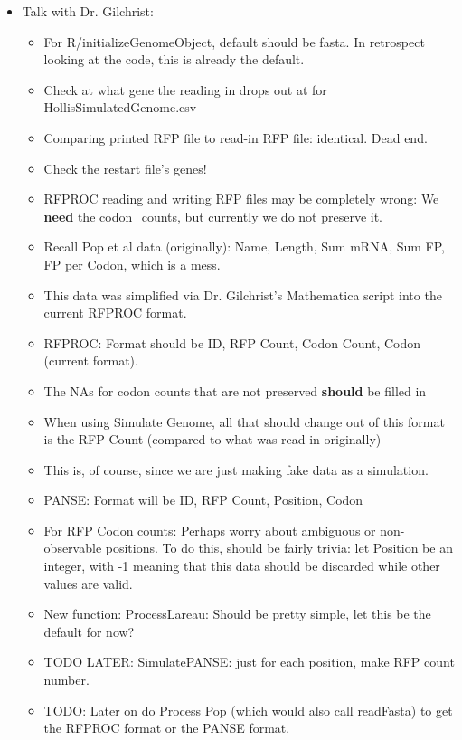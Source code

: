 \documentclass[12pt,hyperref]{labbook}
\begin{document}
\begin{itemize}
    \item Talk with Dr. Gilchrist:
    \begin{itemize}
        \item For R/initializeGenomeObject, default should be fasta.
        In retrospect looking at the code, this is already the default.
        \item Check at what gene the reading in drops out at for HollisSimulatedGenome.csv
        \item Comparing printed RFP file to read-in RFP file: identical. Dead end.
        \item Check the restart file's genes!
        \item RFPROC reading and writing RFP files may be completely wrong: We \textbf{need} the codon\_counts, but currently we do not preserve it.
        \item Recall Pop et al data (originally): Name, Length, Sum mRNA, Sum FP, FP per Codon, which is a mess.
        \item This data was simplified via Dr. Gilchrist's Mathematica script into the current RFPROC format.
        \item RFPROC: Format should be ID, RFP Count, Codon Count, Codon (current format).
        \item The NAs for codon counts that are not preserved \textbf{should} be filled in 
        \item When using Simulate Genome, all that should change out of this format is the RFP Count (compared to what was read in originally)
        \item This is, of course, since we are just making fake data as a simulation.
        \item PANSE: Format will be ID, RFP Count, Position, Codon
        \item For RFP Codon counts: Perhaps worry about ambiguous or non-observable positions.
        To do this, should be fairly trivia: let Position be an integer, with -1 meaning that this data should be discarded while other values are valid.
        \item New function: ProcessLareau: Should be pretty simple, let this be the default for now?
        \item TODO LATER: SimulatePANSE: just for each position, make RFP count number.
        \item TODO: Later on do Process Pop (which would also call readFasta) to get the RFPROC format or the PANSE format.

\end{itemize}
\end{itemize}
\end{document}
